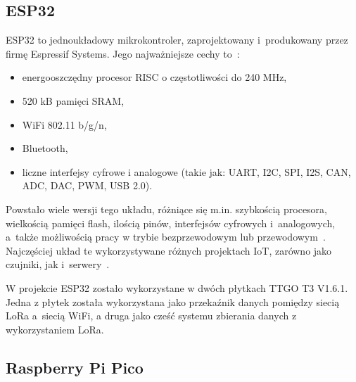 \subsection{ESP32}
ESP32 to jednoukładowy mikrokontroler, zaprojektowany i~produkowany przez firmę Espressif Systems.
Jego najważniejsze cechy to~\cite{ESP32:datasheet}:
\begin{itemize}
    \item energooszczędny procesor RISC o częstotliwości do 240 MHz,
    \item 520 kB pamięci SRAM,
    \item WiFi 802.11 b/g/n,
    \item Bluetooth,
    \item liczne interfejsy cyfrowe i analogowe (takie jak: UART, I2C, SPI, I2S, CAN, ADC, DAC, PWM, USB 2.0).
\end{itemize}

Powstało wiele wersji tego układu, różniące się m.in. szybkością procesora, wielkością pamięci flash, ilością pinów, interfejsów cyfrowych i~analogowych, a~także możliwością pracy w trybie bezprzewodowym lub przewodowym~\cite{ESP32:socs}.
Najczęściej układ te wykorzystywane różnych projektach IoT, zarówno jako czujniki, jak i~serwery~\cite{ESP32:datasheet}.


W projekcie ESP32 zostało wykorzystane w dwóch płytkach TTGO T3 V1.6.1.
Jedna z płytek została wykorzystana jako przekaźnik danych pomiędzy siecią LoRa a~siecią WiFi, a druga jako cześć systemu zbierania danych z wykorzystaniem LoRa.


\subsection{Raspberry Pi Pico}

